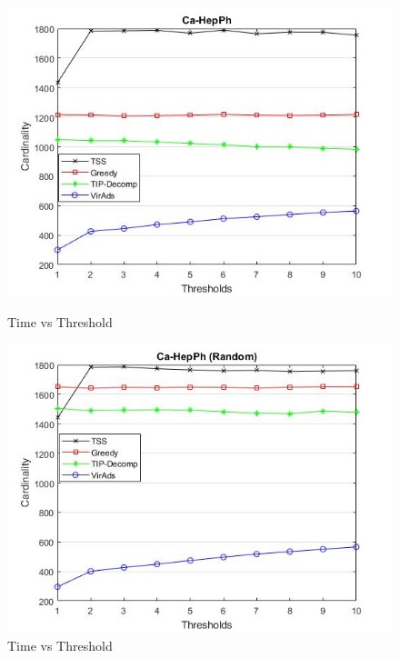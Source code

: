 \begin{figure}[h!]
\begin{minipage}[t]{0.50\textwidth}
\includegraphics[width=\linewidth,keepaspectratio=true]{images/ca-hepphtime.jpg}
\caption{Time vs Threshold}

\end{minipage}
\begin{minipage}[t]{0.50\textwidth}
\includegraphics[width=\linewidth,keepaspectratio=true]{images/ca-hepphrandomtime.jpg}
\caption{Time vs Threshold}
\end{minipage}
\end{figure}

